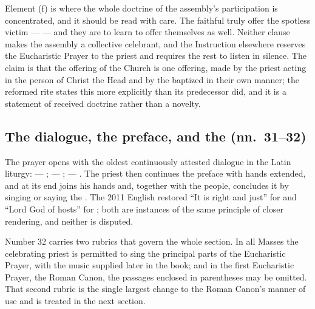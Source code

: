 Element (f) is where the whole doctrine of the assembly's participation is concentrated, and it
should be read with care. The faithful truly offer the spotless victim ---  --- and they are to learn to offer themselves as well. Neither clause makes
the assembly a collective celebrant, and the Instruction elsewhere reserves the Eucharistic
Prayer to the priest and requires the rest to listen in silence. The claim is that the offering
of the Church is one offering, made by the priest acting in the person of Christ the Head and
by the baptized in their own manner; the reformed rite states this more explicitly than its
predecessor did, and it is a statement of received doctrine rather than a novelty.

\subsection{The dialogue, the preface, and the  (nn.\ 31--32)}

The prayer opens with the oldest continuously attested dialogue in the Latin liturgy:
 --- ;  --- ;  --- . The
priest then continues the preface with hands extended, and at its end joins his hands and,
together with the people, concludes it by singing or saying the . The 2011 English restored ``It is right and
just'' for  and ``Lord God of hosts'' for ; both are instances of the same principle of closer rendering, and neither is disputed.

Number 32 carries two rubrics that govern the whole section. In all Masses the celebrating
priest is permitted to sing the principal parts of the Eucharistic Prayer, with the music
supplied later in the book; and in the first Eucharistic Prayer, the Roman Canon, the passages
enclosed in parentheses may be omitted. That second rubric is the
single largest change to the Roman Canon's manner of use and is treated in the next section.

